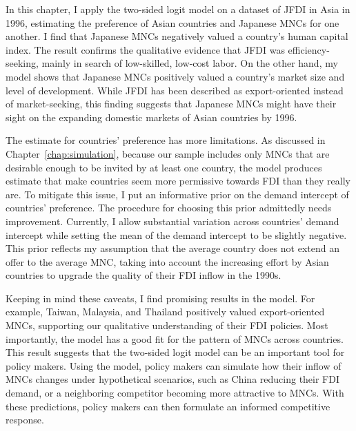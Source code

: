 In this chapter, I apply the two-sided logit model on a dataset of JFDI in Asia
in 1996, estimating the preference of Asian countries and Japanese MNCs for one
another. I find that Japanese MNCs negatively valued a country's human capital
index. The result confirms the qualitative evidence that JFDI was
efficiency-seeking, mainly in search of low-skilled, low-cost labor. On the
other hand, my model shows that Japanese MNCs positively valued a country's
market size and level of development. While JFDI has been described as
export-oriented instead of market-seeking, this finding suggests that Japanese
MNCs might have their sight on the expanding domestic markets of Asian countries
by 1996.

The estimate for countries' preference has more limitations. As discussed in
Chapter~\ref{chap:simulation}, because our sample includes only MNCs that are
desirable enough to be invited by at least one country, the model produces
estimate that make countries seem more permissive towards FDI than they really
are. To mitigate this issue, I put an informative prior on the demand intercept
of countries' preference. The procedure for choosing this prior admittedly needs
improvement. Currently, I allow substantial variation across countries' demand
intercept while setting the mean of the demand intercept to be slightly
negative. This prior reflects my assumption that the average country does not
extend an offer to the average MNC, taking into account the increasing effort by
Asian countries to upgrade the quality of their FDI inflow in the 1990s.

Keeping in mind these caveats, I find promising results in the model. For
example, Taiwan, Malaysia, and Thailand positively valued export-oriented MNCs,
supporting our qualitative understanding of their FDI policies. Most
importantly, the model has a good fit for the pattern of MNCs across countries.
This result suggests that the two-sided logit model can be an important tool for
policy makers. Using the model, policy makers can simulate how their inflow of
MNCs changes under hypothetical scenarios, such as China reducing their FDI
demand, or a neighboring competitor becoming more attractive to MNCs. With these
predictions, policy makers can then formulate an informed competitive
response.

